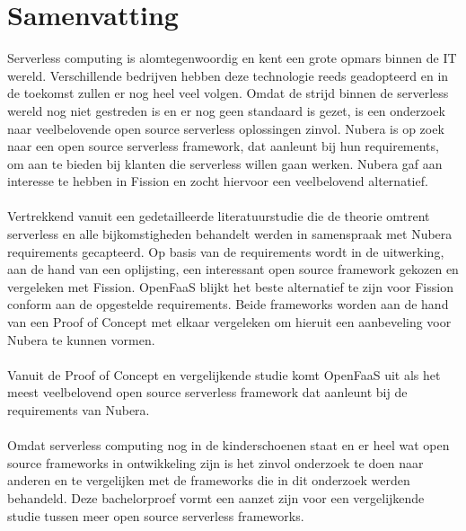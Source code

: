 \chapter*{Samenvatting}
Serverless computing is alomtegenwoordig en kent een grote opmars binnen de IT wereld. Verschillende bedrijven hebben deze technologie reeds geadopteerd en in de toekomst zullen er nog heel veel volgen. Omdat de strijd binnen de serverless wereld nog niet gestreden is en er nog geen standaard is gezet, is een onderzoek naar veelbelovende open source serverless oplossingen zinvol. Nubera is op zoek naar een open source serverless framework, dat aanleunt bij hun requirements, om aan te bieden bij klanten die serverless willen gaan werken. Nubera gaf aan interesse te hebben in Fission en zocht hiervoor een veelbelovend alternatief. 
\\\\
Vertrekkend vanuit een gedetailleerde literatuurstudie die de theorie omtrent serverless en alle bijkomstigheden behandelt werden in samenspraak met Nubera requirements gecapteerd. Op basis van de requirements wordt in de uitwerking, aan de hand van een oplijsting, een interessant open source framework gekozen en vergeleken met Fission. OpenFaaS blijkt het beste alternatief te zijn voor Fission conform aan de opgestelde requirements. Beide frameworks worden aan de hand van een Proof of Concept met elkaar vergeleken om hieruit een aanbeveling voor Nubera te kunnen vormen. 
\\\\
Vanuit de Proof of Concept en vergelijkende studie komt OpenFaaS uit als het meest veelbelovend open source serverless framework dat aanleunt bij de requirements van Nubera.
\\\\
Omdat serverless computing nog in de kinderschoenen staat en er heel wat open source frameworks in ontwikkeling zijn is het zinvol onderzoek te doen naar anderen en te vergelijken met de frameworks die in dit onderzoek werden behandeld. Deze bachelorproef vormt een aanzet zijn voor een vergelijkende studie tussen meer open source serverless frameworks.
